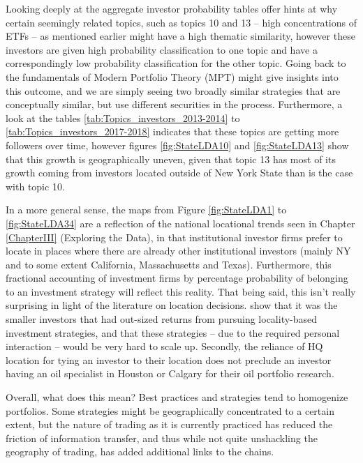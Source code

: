 Looking deeply at the aggregate investor probability tables offer hints at why  certain seemingly related topics, such as topics 10 and 13 -- high concentrations of ETFs -- as mentioned earlier might have a high thematic similarity, however these investors are given high probability classification to one topic and have a correspondingly low probability classification for the other topic.  Going back to the fundamentals of Modern Portfolio Theory (MPT) might give insights into this outcome, and we are simply seeing two broadly similar strategies that are conceptually similar, but use different securities in the process.  Furthermore, a look at the tables \ref{tab:Topics_investors_2013-2014} to \ref{tab:Topics_investors_2017-2018} indicates that these topics are getting more followers over time, however figures \ref{fig:StateLDA10} and \ref{fig:StateLDA13} show that this growth is geographically uneven, given that topic 13 has most of its growth coming from investors located outside of New York State than is the case with topic 10. 

In a more general sense, the maps from Figure \ref{fig:StateLDA1} to \ref{fig:StateLDA34} are a reflection of the national locational trends seen in Chapter \ref{ChapterIII} (Exploring the Data), in that institutional investor firms prefer to locate in places where there are already other institutional investors (mainly NY and to some extent California, Massachusetts and Texas).  Furthermore, this fractional accounting of investment firms by percentage probability of belonging to an investment strategy will reflect this reality.  That being said, this isn't really surprising in light of the literature on location decisions.  \cite{covalthe2001} show that it was the smaller investors that had out-sized returns from pursuing locality-based investment strategies, and that these strategies -- due to the required personal interaction -- would be very hard to scale up.  Secondly, the reliance of HQ location for tying an investor to their location does not preclude an investor having an oil specialist in Houston or Calgary for their oil portfolio research. 

Overall, what does this mean?  Best practices and strategies tend to homogenize portfolios.  Some strategies might be geographically concentrated to a certain extent, but the nature of trading as it is currently practiced has reduced the friction of information transfer, and thus while not quite unshackling the geography of trading, has added additional links to the chains. 

